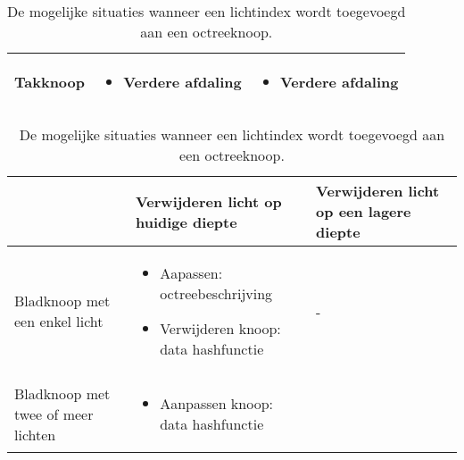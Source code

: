 \begin{table}[tbp]
\begin{tabularx}{\textwidth}{XXX}
      \vspace*{-16pt}
    \vspace{8pt}Takknoop &

      \vspace*{-16pt}
      {\scriptsize
      \begin{itemize}
      \item Verdere afdaling
      \end{itemize}} &

      \vspace*{-16pt}
      {\scriptsize
      \begin{itemize}
      \item Verdere afdaling
      \end{itemize}}\\ \bottomrule
  \end{tabularx}
  \caption{De mogelijke situaties wanneer een lichtindex wordt toegevoegd aan een octreeknoop.}
  \label{tbl:dl-operaties:add}\vspace{8pt}

  \begin{tabularx}{\textwidth}{XXX}\toprule
    & Verwijderen licht op huidige diepte & Verwijderen licht op een lagere diepte \\ \midrule
    
    \vspace*{-16pt}
    \vspace{8pt}Bladknoop met een enkel licht &

    \vspace*{-16pt}
      {\scriptsize
      \begin{itemize}
      \item Aapassen: octreebeschrijving
      \item Verwijderen knoop: data hashfunctie 
      \end{itemize}}&

    \vspace*{-16pt}
     \vspace{8pt} - \\
    \vspace*{-16pt}
    \vspace{8pt} Bladknoop met twee of meer lichten &

      \vspace*{-16pt}
      {\scriptsize
      \begin{itemize}
      \item Aanpassen knoop: data hashfunctie 
      \end{itemize}}&


\end{tabularx}
\end{table}

